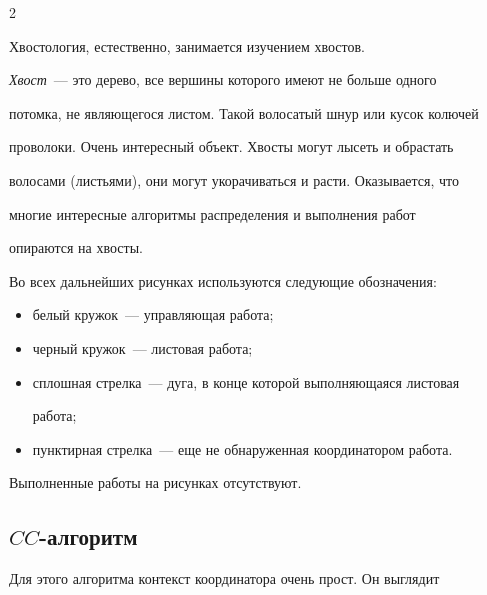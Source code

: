 \begin{multicols}{2}
      


      Хвостология, естественно, занимается изучением хвостов. 


\textit{Хвост}~--- это дерево, все вершины которого имеют не больше одного 


потомка, не являющегося листом. Такой волосатый шнур или кусок колючей 


проволоки. Очень интересный объект. Хвосты могут лысеть и обрастать 


волосами (листьями), они могут укорачиваться и расти. Оказывается, что 


многие интересные алгоритмы распределения и выполнения работ 


опираются на хвосты. 


      


      Во всех дальнейших рисунках используются следующие обозначения:


      \begin{itemize}


\item белый кружок~--- управляющая работа;


\item черный кружок~--- листовая работа;


\item сплошная стрелка~--- дуга, в конце которой выполняющаяся листовая 


работа;


\item пунктирная стрелка~--- еще не обнаруженная координатором работа.


\end{itemize}





Выполненные работы на рисунках отсутствуют.


      


\subsection{$CC$-алгоритм} 








     


      Для этого алгоритма контекст координатора очень прост. Он выглядит 



\end{multicols}
